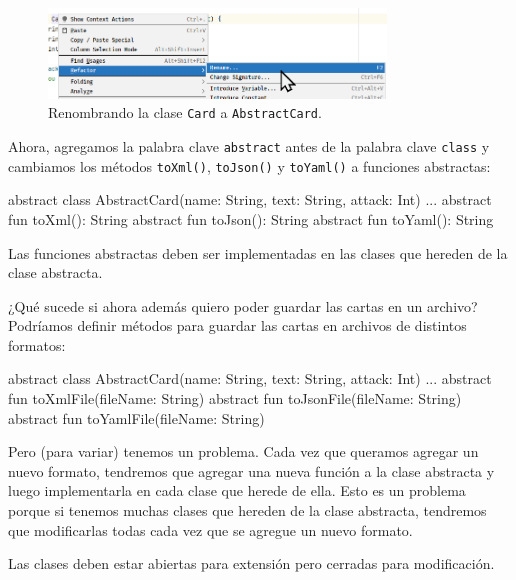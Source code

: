   \begin{figure}[ht!]
    \centering
    \includegraphics[width=0.8\textwidth]{img/oop/principios/clases_abstractas/idea64_rename.png}
    \caption{Renombrando la clase \texttt{Card} a \texttt{AbstractCard}.}
    \label{fig:oop:principios:clases_abstractas:rename}
  \end{figure}

  Ahora, agregamos la palabra clave \texttt{abstract} antes de la palabra clave \texttt{class} y
  cambiamos los métodos \texttt{toXml()}, \texttt{toJson()} y \texttt{toYaml()} a funciones
  abstractas:

  \begin{kotlin}
    abstract class AbstractCard(name: String, text: String, attack: Int) {
      ...
      abstract fun toXml(): String
      abstract fun toJson(): String
      abstract fun toYaml(): String
    }
  \end{kotlin}

  \begin{important}
    Las funciones abstractas deben ser implementadas en las clases que hereden de la clase
    abstracta.
  \end{important}

  ¿Qué sucede si ahora además quiero poder guardar las cartas en un archivo?
  Podríamos definir métodos para guardar las cartas en archivos de distintos formatos:

  \begin{kotlin}
    abstract class AbstractCard(name: String, text: String, attack: Int) {
      ...
      abstract fun toXmlFile(fileName: String)
      abstract fun toJsonFile(fileName: String)
      abstract fun toYamlFile(fileName: String)
    }
  \end{kotlin}

  Pero (para variar) tenemos un problema.
  Cada vez que queramos agregar un nuevo formato, tendremos que agregar una nueva función a la
  clase abstracta y luego implementarla en cada clase que herede de ella.
  Esto es un problema porque si tenemos muchas clases que hereden de la clase abstracta, tendremos
  que modificarlas todas cada vez que se agregue un nuevo formato.

  \begin{defaultbox}
    Las clases deben estar abiertas para extensión pero cerradas para modificación.
  \end{defaultbox}

